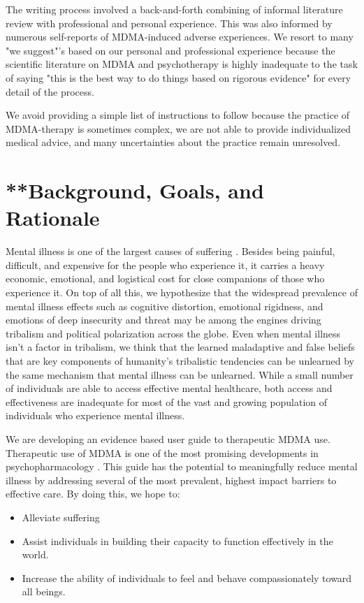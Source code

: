 \documentclass[12pt,letterpaper]{book}
\begin{document}
The writing process involved a back-and-forth combining of informal literature review with professional and personal experience. This was also informed by numerous self-reports of MDMA-induced adverse experiences. We resort to many "we suggest"'s based on our personal and professional experience because the scientific literature on MDMA and psychotherapy is highly inadequate to the task of saying "this is the best way to do things based on rigorous evidence" for every detail of the process.  


We avoid providing a simple list of instructions to follow because the practice of MDMA-therapy is sometimes complex, we are not able to provide individualized medical advice, and many uncertainties about the practice remain unresolved.

\section{**Background, Goals, and Rationale}

Mental illness is one of the largest causes of suffering \cite{mentalhealthpriority}. Besides being painful, difficult, and expensive for the people who experience it, it carries a heavy economic, emotional, and logistical cost for close companions of those who experience it. On top of all this, we hypothesize that the widespread prevalence of mental illness effects such as cognitive distortion, emotional rigidness, and emotions of deep insecurity and threat may be among the engines driving tribalism and political polarization across the globe. Even when mental illness isn't a factor in tribalism, we think that the learned maladaptive and false beliefs that are key components of humanity's tribalistic tendencies \cite{klein2020Polarized} can be unlearned by the same mechanism that mental illness can be unlearned. While a small number of individuals are able to access effective mental healthcare, both access and effectiveness are inadequate for most of the vast and growing population of individuals who experience mental illness.

We are developing an evidence based user guide to therapeutic MDMA use. Therapeutic use of MDMA is one of the most promising developments in psychopharmacology \cite{mitchellMDMAClinicalTrial2}. This guide has the potential to meaningfully reduce mental illness by addressing several of the most prevalent, highest impact barriers to effective care. By doing this, we hope to:
\begin{itemize}
	\item Alleviate suffering
	\item Assist individuals in building their capacity to function effectively in the world.
	\item Increase the ability of individuals to feel and behave compassionately toward all beings.
\end{itemize}
\end{document}
